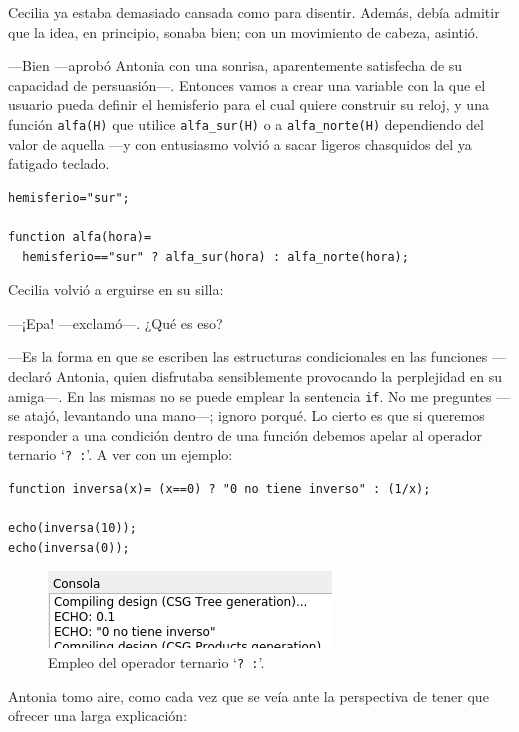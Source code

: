 Cecilia ya estaba demasiado cansada como para disentir. Además, debía
admitir que la idea, en principio, sonaba bien; con un movimiento de
cabeza, asintió.

---Bien ---aprobó Antonia con una sonrisa, aparentemente satisfecha de
su capacidad de persuasión---. Entonces vamos a crear una variable con
la que el usuario pueda definir el hemisferio para el cual quiere
construir su reloj, y una función \lstinline!alfa(H)! que utilice
\lstinline!alfa_sur(H)!  o a \lstinline!alfa_norte(H)! dependiendo del
valor de aquella ---y con entusiasmo volvió a sacar ligeros chasquidos
del ya fatigado teclado.


\begin{lstlisting}
hemisferio="sur";

function alfa(hora)=
  hemisferio=="sur" ? alfa_sur(hora) : alfa_norte(hora);
\end{lstlisting}

Cecilia volvió a erguirse en su silla:

---¡Epa!  ---exclamó---. ¿Qué es eso?

---Es la forma en que se escriben las estructuras condicionales en las
funciones ---declaró Antonia, quien disfrutaba sensiblemente
provocando la perplejidad en su amiga---. En las mismas no se puede
emplear la sentencia \lstinline!if!. No me preguntes ---se atajó,
levantando una mano---; ignoro porqué. Lo cierto es que si queremos
responder a una condición dentro de una función debemos apelar al
operador ternario `\lstinline!? :!'. A ver con un ejemplo:


\begin{lstlisting}
function inversa(x)= (x==0) ? "0 no tiene inverso" : (1/x);

echo(inversa(10));
echo(inversa(0));
\end{lstlisting}

\begin{figure}[ht]
  \centering
  \includegraphics[width=.65\textwidth]{imagenes/consola-echo-inversa}
  \caption{Empleo del operador ternario `\lstinline!? :!'.}
  \label{fig:consola-echo-inversa}
\end{figure}
  


Antonia tomo aire, como cada vez que se veía ante la perspectiva de
tener que ofrecer una larga explicación:


